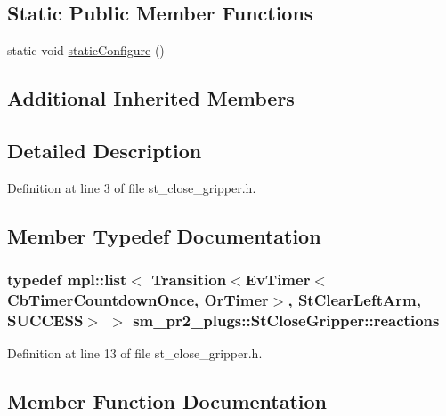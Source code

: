 \subsection*{Static Public Member Functions}
\begin{DoxyCompactItemize}
\item 
static void \hyperlink{structsm__pr2__plugs_1_1StCloseGripper_a72d68b4e2478674f5022f93ce881bbd6}{static\+Configure} ()
\end{DoxyCompactItemize}
\subsection*{Additional Inherited Members}


\subsection{Detailed Description}


Definition at line 3 of file st\+\_\+close\+\_\+gripper.\+h.



\subsection{Member Typedef Documentation}
\subsubsection[{\texorpdfstring{reactions}{reactions}}]{\setlength{\rightskip}{0pt plus 5cm}typedef mpl\+::list$<$ Transition$<$Ev\+Timer$<$Cb\+Timer\+Countdown\+Once, {\bf Or\+Timer}$>$, {\bf St\+Clear\+Left\+Arm}, {\bf S\+U\+C\+C\+E\+SS}$>$ $>$ {\bf sm\+\_\+pr2\+\_\+plugs\+::\+St\+Close\+Gripper\+::reactions}}\hypertarget{structsm__pr2__plugs_1_1StCloseGripper_a0ad3f271dea7b36dc6ac599b9818bb77}{}\label{structsm__pr2__plugs_1_1StCloseGripper_a0ad3f271dea7b36dc6ac599b9818bb77}


Definition at line 13 of file st\+\_\+close\+\_\+gripper.\+h.



\subsection{Member Function Documentation}
